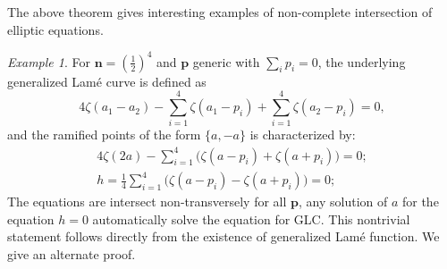 \documentclass[11pt]{amsart}
\theoremstyle{remark}
\newtheorem{example}[theorem]{Example}
\numberwithin{equation}{section}
\begin{document}
The above theorem gives interesting examples of non-complete intersection of elliptic equations. 
\begin{example}
For $\mathbf{n} = (\tfrac{1}{2})^4$ and $\mathbf{p}$ generic with $\sum_i p_i=0$, the underlying generalized Lam\'e curve is defined as
\[
    4 \zeta(a_1-a_2) - \sum_{i=1}^4\zeta(a_1-p_i) + \sum_{i=1}^4 \zeta(a_2-p_i)  =0,
\]
and the ramified points of the form $\{ a,-a \}$ is characterized by:
\[
\begin{split}
    4\zeta(2a) - \sum_{i=1}^4 \Big( \zeta(a-p_i) + \zeta(a+p_i)  \Big) =0;
    \\
    h = \frac{1}{4} \sum_{i=1}^4 \Big( \zeta(a-p_i) - \zeta(a + p_i) \Big)=0;
\end{split}
\]
The equations are intersect non-transversely for all $\mathbf{p}$, any solution of $a$ for the equation $h=0$ automatically solve the equation for GLC. This nontrivial statement follows directly from the existence of generalized Lam\'e function. We give an alternate proof.


\end{example}
\end{document}
